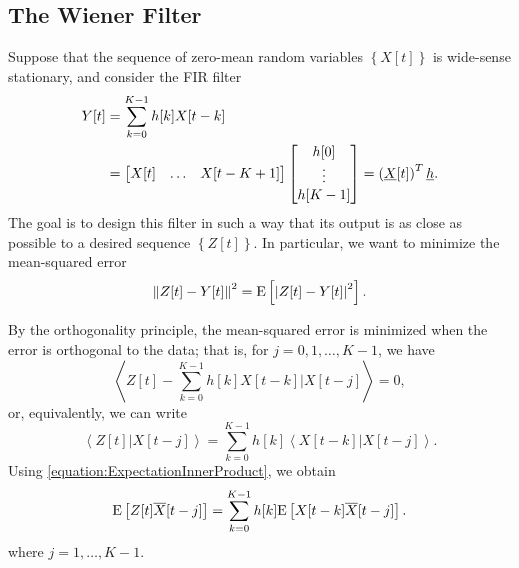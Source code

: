 \subsection{The Wiener Filter}

Suppose that the sequence of zero-mean random variables $\left\{ X[t] \right\}$ is wide-sense stationary, and consider the FIR filter
\begin{equation*}
\begin{split}
Y[t] &= \sum_{k=0}^{K-1} h[k] X[t - k] \\
&= \begin{bmatrix} X[t] & \hdots & X[t-K+1] \end{bmatrix}
\begin{bmatrix} h[0] \\ \vdots \\ h[K-1] \end{bmatrix}
= \left( \underline{X}[t] \right)^T \underline{h} .
\end{split}
\end{equation*}
The goal is to design this filter in such a way that its output is as close as possible to a desired sequence $\left\{ Z[t] \right\}$.
In particular, we want to minimize the mean-squared error
\begin{equation*}
\left\| Z[t] - Y[t] \right\|^2 = \mathrm{E} \left[ \left| Z[t] - Y[t] \right|^2 \right].
\end{equation*}

By the orthogonality principle, the mean-squared error is minimized when the error is orthogonal to the data; that is, for $j = 0, 1, \ldots, K-1$, we have
\begin{equation*}
\left\langle Z[t] - \sum_{k=0}^{K-1} h[k] X[t - k] \Big| X[t - j] \right\rangle = 0,
\end{equation*}
or, equivalently, we can write
\begin{equation*}
\left\langle Z[t] | X[t - j] \right\rangle
= \sum_{k=0}^{K-1} h[k] \left\langle X[t - k] | X[t - j] \right\rangle .
\end{equation*}
Using \eqref{equation:ExpectationInnerProduct}, we obtain
\begin{equation} \label{equation:WienerHopfConditions}
\mathrm{E} \left[ Z[t] \overline{X}[t - j] \right]
= \sum_{k=0}^{K-1} h[k] \mathrm{E} \left[ X[t - k] \overline{X}[t - j] \right] .
\end{equation}
where $j = 1, \ldots, K-1$.

